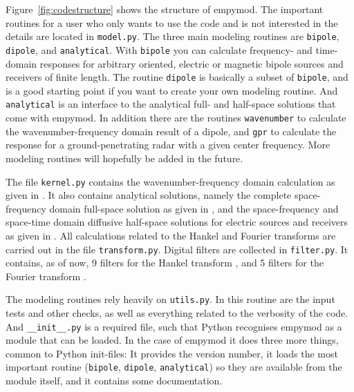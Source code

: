\documentclass[manuscript,revised]{geophysics}
\begin{document}

Figure~\ref{fig:codestructure} shows the structure of empymod.%
%
%
%
The important routines for a user who only wants to use the code and is not
interested in the details are located in \texttt{model.py}. The three main
modeling routines are \texttt{bipole}, \texttt{dipole}, and
\texttt{analytical}. With \texttt{bipole} you can calculate frequency- and
time-domain responses for arbitrary oriented, electric or magnetic bipole
sources and receivers of finite length. The routine \texttt{dipole} is
basically a subset of \texttt{bipole}, and is a good starting point if you want
to create your own modeling routine. And \texttt{analytical} is an interface to
the analytical full- and half-space solutions that come with empymod. In
addition there are the routines \texttt{wavenumber} to calculate the
wavenumber-frequency domain result of a dipole, and \texttt{gpr} to calculate
the response for a ground-penetrating radar with a given center frequency. More
modeling routines will hopefully be added in the future.

The file \texttt{kernel.py} contains the wavenumber-frequency domain
calculation as given in \cite{GEO.16.Hunziker}. It also contains analytical
solutions, namely the complete space-frequency domain full-space solution as
given in \cite{GEO.16.Hunziker}, and the space-frequency and space-time domain
diffusive half-space solutions for electric sources and receivers as given in
\cite{PIER.10.Slob}. All calculations related to the Hankel and Fourier
transforms are carried out in the file \texttt{transform.py}.  Digital filters
are collected in \texttt{filter.py}. It contains, as of now, 9 filters for the
Hankel transform \citep{TMS.82.Anderson, GEO.12.Key, GEO.09.Key, GP.07.Kong},
and 5 filters for the Fourier transform \citep{GEO.12.Key, GEO.09.Key}.

The modeling routines rely heavily on \texttt{utils.py}. In this routine are
the input tests and other checks, as well as everything related to the
verbosity of the code.  And \texttt{\_\_init\_\_.py} is a required file, such
that Python recognises empymod as a module that can be loaded. In the case of
empymod it does three more things, common to Python init-files: It provides the
version number, it loads the most important routine (\texttt{bipole},
\texttt{dipole}, \texttt{analytical}) so they are available from the module
itself, and it contains some documentation.
\end{document}
